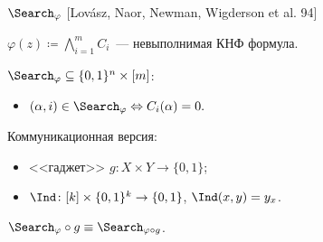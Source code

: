 \begin{frame}{$\Search_{\varphi}$ [Lov{\'{a}}sz, Naor, Newman, Wigderson et al. 94]}
    
    $\varphi(z) \coloneqq \bigwedge\limits_{i = 1}^{m} C_i$~--- невыполнимая КНФ формула.
    \pause
    
    $\Search_{\varphi} \subseteq \{0, 1\}^n \times [m]$:
    \begin{itemize}
        \item $(\alpha, i) \in \Search_{\varphi} \Leftrightarrow C_{i}(\alpha) = 0.$
    \end{itemize}

    \pause
    \vspace{0.1cm}
    Коммуникационная версия:
    \begin{itemize}
        \item{} <<гаджет>> $g\colon X \times Y \to \{0, 1\}$;
        \item $\Ind\colon [k] \times \{0, 1\}^k \to \{0, 1\}$, $\Ind(x, y) = y_x$.
    \end{itemize}

    \pause
    \begin{center}
        
    \end{center}


    $\Search_{\varphi} \circ g \equiv \Search_{\varphi \circ g}$.
\end{frame}


